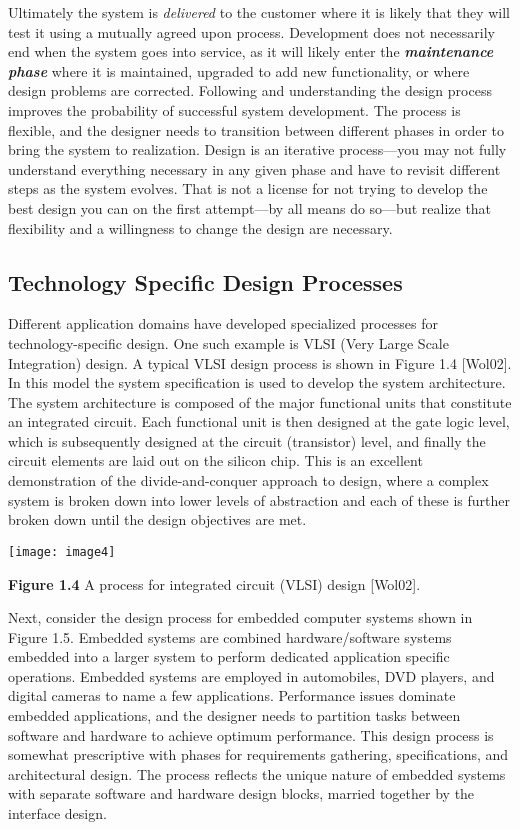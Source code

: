 Ultimately the system is \emph{delivered} to the customer where it is
likely that they will test it using a mutually agreed upon process.
Development does not necessarily end when the system goes into service,
as it will likely enter the \emph{\textbf{maintenance phase}} where it
is maintained, upgraded to add new functionality, or where design
problems are corrected. Following and understanding the design process
improves the probability of successful system development. The process
is flexible, and the designer needs to transition between different
phases in order to bring the system to realization. Design is an
iterative process---you may not fully understand everything necessary in
any given phase and have to revisit different steps as the system
evolves. That is not a license for not trying to develop the best design
you can on the first attempt---by all means do so---but realize that
flexibility and a willingness to change the design are necessary.

\subsection{Technology Specific Design Processes}

Different application domains have developed specialized processes for
technology-specific design. One such example is VLSI (Very Large Scale
Integration) design. A typical VLSI design process is shown in Figure
1.4 {[}Wol02{]}. In this model the system specification is used to
develop the system architecture. The system architecture is composed of
the major functional units that constitute an integrated circuit. Each
functional unit is then designed at the gate logic level, which is
subsequently designed at the circuit (transistor) level, and finally the
circuit elements are laid out on the silicon chip. This is an excellent
demonstration of the divide-and-conquer approach to design, where a
complex system is broken down into lower levels of abstraction and each
of these is further broken down until the design objectives are met.

 \texttt{[image: image4]}

\textbf{Figure 1.4} A process for integrated circuit (VLSI) design
{[}Wol02{]}.

Next, consider the design process for embedded computer systems shown in
Figure 1.5. Embedded systems are combined hardware/software systems
embedded into a larger system to perform dedicated application specific
operations. Embedded systems are employed in automobiles, DVD players,
and digital cameras to name a few applications. Performance issues
dominate embedded applications, and the designer needs to partition
tasks between software and hardware to achieve optimum performance. This
design process is somewhat prescriptive with phases for requirements
gathering, specifications, and architectural design. The process
reflects the unique nature of embedded systems with separate software
and hardware design blocks, married together by the interface design.

